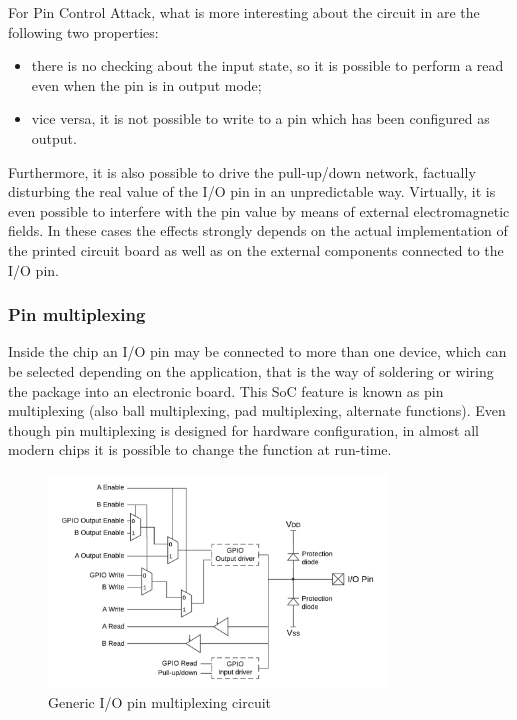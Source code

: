 For Pin Control Attack, what is more interesting about the circuit in  are the following two properties:
\begin{itemize}
	\item there is no checking about the input state, so it is possible to perform a read even when the pin is in output mode;
	\item vice versa, it is not possible to write to a pin which has been configured as output.
\end{itemize}

Furthermore, it is also possible to drive the pull-up/down network, factually disturbing the real value of the I/O pin in an unpredictable way.
Virtually, it is even possible to interfere with the pin value by means of external electromagnetic fields.
In these cases the effects strongly depends on the actual implementation of the printed circuit board as well as on the external components connected to the I/O pin.


\subsubsection{Pin multiplexing}

Inside the chip an I/O pin may be connected to more than one device, which can be selected depending on the application,
that is the way of soldering or wiring the package into an electronic board.
This SoC feature is known as pin multiplexing (also ball multiplexing, pad multiplexing, alternate functions).
Even though pin multiplexing is designed for hardware configuration, in almost all modern chips it is possible to change the function at run-time.

\begin{figure}[h]
\centerline{\includegraphics[width=0.8\textwidth]{res/pinmux}}
\caption{Generic I/O pin multiplexing circuit \label{fig:pinmux}}
\end{figure}

